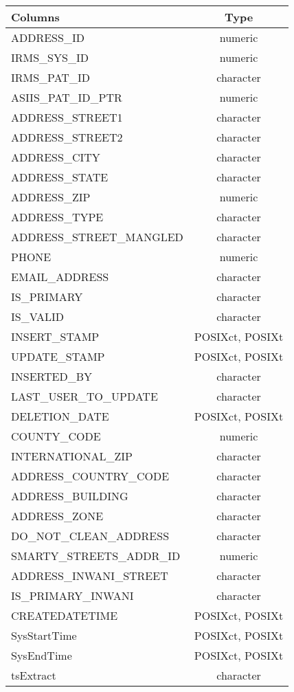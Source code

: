 \documentclass[
  letterpaper,
  DIV=11,
  numbers=noendperiod]{scrreprt}
\begin{document}
\begin{longtable}{lc}
\toprule
Columns & Type \\ 
\midrule
ADDRESS\_ID & numeric \\ 
IRMS\_SYS\_ID & numeric \\ 
IRMS\_PAT\_ID & character \\ 
ASIIS\_PAT\_ID\_PTR & numeric \\ 
ADDRESS\_STREET1 & character \\ 
ADDRESS\_STREET2 & character \\ 
ADDRESS\_CITY & character \\ 
ADDRESS\_STATE & character \\ 
ADDRESS\_ZIP & numeric \\ 
ADDRESS\_TYPE & character \\ 
ADDRESS\_STREET\_MANGLED & character \\ 
PHONE & numeric \\ 
EMAIL\_ADDRESS & character \\ 
IS\_PRIMARY & character \\ 
IS\_VALID & character \\ 
INSERT\_STAMP & POSIXct, POSIXt \\ 
UPDATE\_STAMP & POSIXct, POSIXt \\ 
INSERTED\_BY & character \\ 
LAST\_USER\_TO\_UPDATE & character \\ 
DELETION\_DATE & POSIXct, POSIXt \\ 
COUNTY\_CODE & numeric \\ 
INTERNATIONAL\_ZIP & character \\ 
ADDRESS\_COUNTRY\_CODE & character \\ 
ADDRESS\_BUILDING & character \\ 
ADDRESS\_ZONE & character \\ 
DO\_NOT\_CLEAN\_ADDRESS & character \\ 
SMARTY\_STREETS\_ADDR\_ID & numeric \\ 
ADDRESS\_INWANI\_STREET & character \\ 
IS\_PRIMARY\_INWANI & character \\ 
CREATEDATETIME & POSIXct, POSIXt \\ 
SysStartTime & POSIXct, POSIXt \\ 
SysEndTime & POSIXct, POSIXt \\ 
tsExtract & character \\ 
\bottomrule
\end{longtable}
\end{document}
